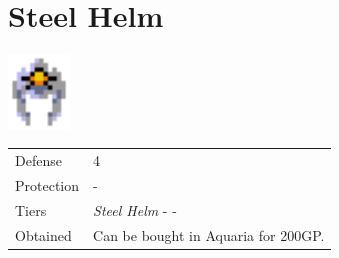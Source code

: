 \section{Steel Helm}
\label{armor:steel_helm}

\includegraphics[height=2cm,keepaspectratio]{./resources/armors/steelhelm}

\begin{longtable}{ l p{9cm} }
	Defense
	& 4
\\ %
	Protection
	& -
\\ %
	Tiers
	& \textit{Steel Helm} - \nameref{armor:moon_helm} - \nameref{armor:apollo_helm}
\\ %
	Obtained
	& Can be bought in Aquaria for 200GP.
\end{longtable}

